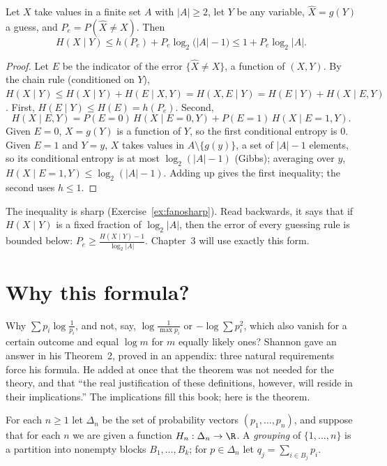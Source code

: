 \begin{theorem}\label{thm:fano}
Let $X$ take values in a finite set $A$ with $|A|\ge2$, let $Y$ be any variable, $\hat X=g(Y)$ a guess, and $P_e=P(\hat X\ne X)$. Then
\[
H(X\mid Y)\le h(P_e)+P_e\log_2\bigl(|A|-1\bigr)\le1+P_e\log_2|A|.
\]
\end{theorem}

\begin{proof}
Let $E$ be the indicator of the error $\{\hat X\ne X\}$, a function of $(X,Y)$. By the chain rule (conditioned on $Y$), $H(X\mid Y)\le H(X\mid Y)+H(E\mid X,Y)=H(X,E\mid Y)=H(E\mid Y)+H(X\mid E,Y)$. First, $H(E\mid Y)\le H(E)=h(P_e)$. Second,
\[
H(X\mid E,Y)=P(E=0)\,H(X\mid E=0,Y)+P(E=1)\,H(X\mid E=1,Y).
\]
Given $E=0$, $X=g(Y)$ is a function of $Y$, so the first conditional entropy is $0$. Given $E=1$ and $Y=y$, $X$ takes values in $A\setminus\{g(y)\}$, a set of $|A|-1$ elements, so its conditional entropy is at most $\log_2(|A|-1)$ (Gibbs); averaging over $y$, $H(X\mid E=1,Y)\le\log_2(|A|-1)$. Adding up gives the first inequality; the second uses $h\le1$.
\end{proof}

The inequality is sharp (Exercise~\ref{ex:fanosharp}). Read backwards, it says that if $H(X\mid Y)$ is a fixed fraction of $\log_2|A|$, then the error of every guessing rule is bounded below: $P_e\ge\frac{H(X\mid Y)-1}{\log_2|A|}$. Chapter~3 will use exactly this form.

\section{Why this formula?}\label{sec:axioms}

Why $\sum p_i\log\frac1{p_i}$, and not, say, $\log\frac1{\max p_i}$ or $-\log\sum p_i^2$, which also vanish for a certain outcome and equal $\log m$ for $m$ equally likely ones? Shannon gave an answer in his Theorem~2, proved in an appendix: three natural requirements force his formula. He added at once that the theorem was not needed for the theory, and that ``the real justification of these definitions, however, will reside in their implications.'' The implications fill this book; here is the theorem.

For each $n\ge1$ let $\Delta_n$ be the set of probability vectors $(p_1,\dots,p_n)$, and suppose that for each $n$ we are given a function $H_n:\Delta_n\to\R$. A \emph{grouping} of $\{1,\dots,n\}$ is a partition into nonempty blocks $B_1,\dots,B_k$; for $p\in\Delta_n$ let $q_j=\sum_{i\in B_j}p_i$.

